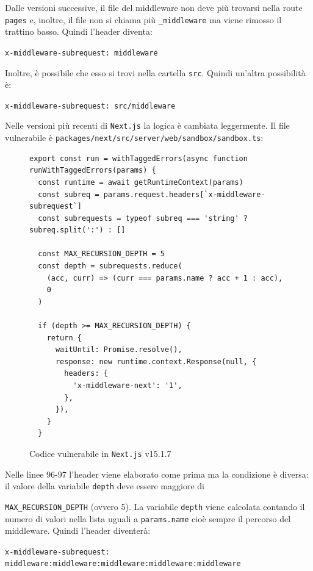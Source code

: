 \documentclass[a4paper,oneside,12pt]{report}
\begin{document}
Dalle versioni successive, il file del middleware non deve pi\`u trovarsi nella route \texttt{pages} e, inoltre, il file non si chiama pi\`u \texttt{\_middleware} ma viene rimosso il trattino basso. Quindi l'header diventa:
\begin{center}
	\scriptsize
	\texttt{x-middleware-subrequest: middleware}
\end{center}

Inoltre, \`e possibile che esso si trovi nella cartella \texttt{src}. Quindi un'altra possibilit\`a \`e:
\begin{center}
	\scriptsize
	\texttt{x-middleware-subrequest: src/middleware}
\end{center}

Nelle versioni pi\`u recenti di \texttt{Next.js} la logica \`e cambiata leggermente. Il file vulnerabile \`e \texttt{packages/next/src/server/web/sandbox/sandbox.ts}:
\begin{figure}[H]
	\centering
\begin{verbatim}
export const run = withTaggedErrors(async function runWithTaggedErrors(params) {
  const runtime = await getRuntimeContext(params)
  const subreq = params.request.headers[`x-middleware-subrequest`]
  const subrequests = typeof subreq === 'string' ? subreq.split(':') : []

  const MAX_RECURSION_DEPTH = 5
  const depth = subrequests.reduce(
    (acc, curr) => (curr === params.name ? acc + 1 : acc),
    0
  )

  if (depth >= MAX_RECURSION_DEPTH) {
    return {
      waitUntil: Promise.resolve(),
      response: new runtime.context.Response(null, {
        headers: {
          'x-middleware-next': '1',
        },
      }),
    }
  }
\end{verbatim}
	\caption{Codice vulnerabile in \texttt{Next.js} v15.1.7}
	\label{fig:nextjs-vulnerable-code-v15.1.7}
\end{figure}
Nelle linee 96-97 l'header viene elaborato come prima ma la condizione \`e diversa: il valore della variabile \texttt{depth} deve essere maggiore di \raggedright\texttt{MAX\_RECURSION\_DEPTH} (ovvero 5). La variabile \texttt{depth} viene calcolata contando il numero di valori nella lista uguali a \texttt{params.name} cio\`e sempre il percorso del middleware. Quindi l'header diventer\`a:
\begin{center}
	\scriptsize
	\texttt{x-middleware-subrequest: middleware:middleware:middleware:middleware:middleware}
\end{center}
\end{document}
